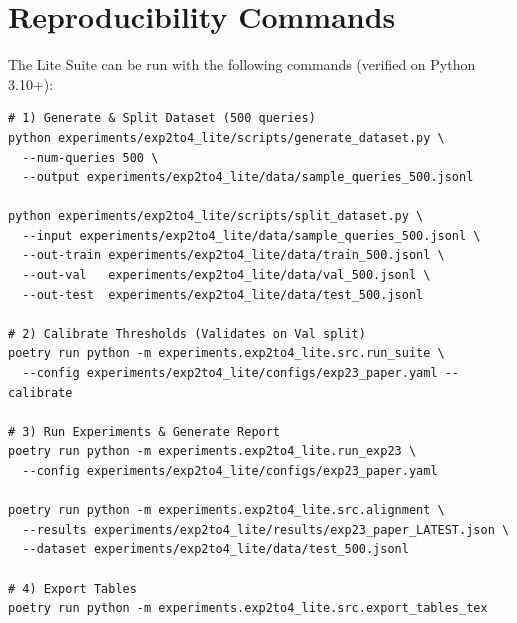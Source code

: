 \documentclass[12pt]{article}
\begin{document}
\section{Reproducibility Commands}\label{sec:repro_commands}
The Lite Suite can be run with the following commands (verified on Python 3.10+):

\begin{verbatim}
# 1) Generate & Split Dataset (500 queries)
python experiments/exp2to4_lite/scripts/generate_dataset.py \
  --num-queries 500 \
  --output experiments/exp2to4_lite/data/sample_queries_500.jsonl

python experiments/exp2to4_lite/scripts/split_dataset.py \
  --input experiments/exp2to4_lite/data/sample_queries_500.jsonl \
  --out-train experiments/exp2to4_lite/data/train_500.jsonl \
  --out-val   experiments/exp2to4_lite/data/val_500.jsonl \
  --out-test  experiments/exp2to4_lite/data/test_500.jsonl

# 2) Calibrate Thresholds (Validates on Val split)
poetry run python -m experiments.exp2to4_lite.src.run_suite \
  --config experiments/exp2to4_lite/configs/exp23_paper.yaml --calibrate

# 3) Run Experiments & Generate Report
poetry run python -m experiments.exp2to4_lite.run_exp23 \
  --config experiments/exp2to4_lite/configs/exp23_paper.yaml

poetry run python -m experiments.exp2to4_lite.src.alignment \
  --results experiments/exp2to4_lite/results/exp23_paper_LATEST.json \
  --dataset experiments/exp2to4_lite/data/test_500.jsonl

# 4) Export Tables
poetry run python -m experiments.exp2to4_lite.src.export_tables_tex
\end{verbatim}
\end{document}
